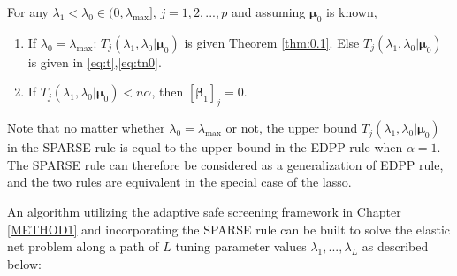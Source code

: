 \begin{theorem}[SPARSE]
    \label{thm:rule}
    For any $\lambda_1<\lambda_{0}\in (0,\lambda_\textrm{max}]$, $j=1,2,...,p$ and assuming $\boldsymbol\mu_0$ is known,
    \begin{enumerate}
        \item If $\lambda_0=\lambda_{\max}$: $T_j(\lambda_1,\lambda_0|\boldsymbol\mu_0)$ is given Theorem \ref{thm:0.1}. Else $T_j(\lambda_1,\lambda_0|\boldsymbol\mu_0)$ is given in \eqref{eq:t},\eqref{eq:tn0}.
        \item If $T_j(\lambda_1,\lambda_0|\boldsymbol\mu_0)<n\alpha$, then $[\boldsymbol\beta_{1}]_j=0$.
    \end{enumerate}
\end{theorem}
Note that no matter whether $\lambda_0=\lambda_{\max}$ or not, the upper bound $T_j(\lambda_1,\lambda_0|\boldsymbol\mu_0)$ in the SPARSE rule is equal to the upper bound in the EDPP rule when $\alpha=1$. The SPARSE rule can therefore be considered as a generalization of EDPP rule, and the two rules are equivalent in the special case of the lasso.

An algorithm utilizing the adaptive safe screening framework in Chapter \ref{METHOD1} and incorporating the SPARSE rule can be built to solve the elastic net problem along a path of $L$ tuning parameter values $\lambda_1,...,\lambda_L$ as described below:

